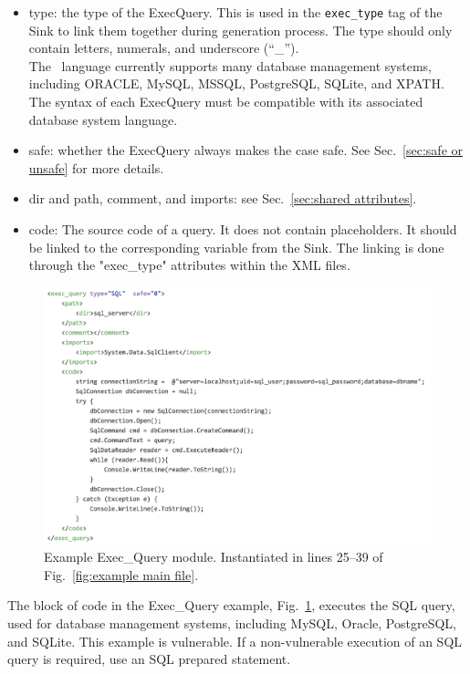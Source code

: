 \begin{itemize}
    \item type: the type of the ExecQuery. This is used in the
    \verb|exec_type| tag of the Sink to link them together during
    generation process.  The type should only contain letters, numerals, and
    underscore (``\_'').\\
    The \CSharp\ language currently supports many database management
    systems, including ORACLE, MySQL, MSSQL, PostgreSQL, SQLite, and XPATH.
    The syntax of each ExecQuery must be
    compatible with its associated database system language.
    
    \item safe: whether the ExecQuery always makes the case safe.
    See Sec.~\ref{sec:safe or unsafe} for more details.

    \item dir and path, comment, and imports: see Sec.~\ref{sec:shared attributes}.

    \item code: The source code of a query. It does not contain placeholders.
    It should be linked to the corresponding variable from the Sink. The linking is done through the "exec\_type" attributes within the XML files.
\end{itemize}


\begin{figure}[htbp]
  \includegraphics[width=\linewidth]{fig_Exec_Query_file.png}
  \caption{Example Exec\_Query module. Instantiated in lines 25--39 of
    Fig.~\ref{fig:example main file}.}
  \label{fig:example exec-query file}
\end{figure}

The block of code in the Exec\_Query example, 
Fig.~\ref{fig:example exec-query file}, executes the SQL query, used 
for database management
systems, including MySQL, Oracle, PostgreSQL, and SQLite.  This example is
vulnerable.  If a non-vulnerable execution of an SQL query is required,
use an SQL prepared statement.


